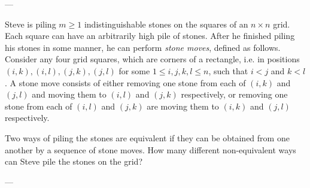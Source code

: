 
---

Steve is piling $m\ge 1$ indistinguishable stones on the squares of an $n\times n$ grid. Each square can have an arbitrarily high pile of stones. After he finished piling his stones in some manner, he can perform \emph{stone moves}, defined as follows. Consider any four grid squares, which are corners of a rectangle, i.e. in positions $(i,k),(i,l),(j,k),(j,l)$ for some $1\le i,j,k,l\le n$, such that $i<j$ and $k<l$. A stone move consists of either removing one stone from each of $(i,k)$ and $(j,l)$ and moving them to $(i,l)$ and $(j,k)$ respectively, or removing one stone from each of $(i,l)$ and $(j,k)$ are moving them to $(i,k)$ and $(j,l)$ respectively.

Two ways of piling the stones are equivalent if they can be obtained from one another by a sequence of stone moves. How many different non-equivalent ways can Steve pile the stones on the grid?

---

